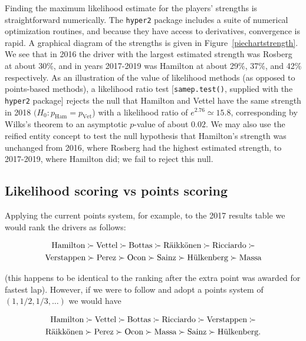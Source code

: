 \documentclass[a4,12pt]{article}
\begin{document}
Finding the maximum likelihood estimate for the players' strengths is
straightforward numerically. The \texttt{hyper2} package includes a
suite of numerical optimization routines, and because they have access
to derivatives, convergence is rapid.  A graphical diagram of the
strengths is given in Figure~\ref{piechartstrength}.  We see that in
2016 the driver with the largest estimated strength was Rosberg at
about 30\%, and in years 2017-2019 was Hamilton at about 29\%, 37\%,
and 42\% respectively. As an illustration of the value of likelihood
methods (as opposed to points-based methods), a likelihood ratio test
[\texttt{samep.test()}, supplied with the \texttt{hyper2} package]
rejects the null that Hamilton and Vettel have the same strength in
2018 $(H_0\colon p_\mathrm{Ham}= p_\mathrm{Vet}$) with a likelihood
ratio of $e^{2.76}\simeq 15.8$, corresponding by Wilks's theorem to an
asymptotic \(p\)-value of about \(0.02\). We may also use the reified
entity concept to test the null hypothesis that Hamilton's strength
was unchanged from 2016, where Rosberg had the highest estimated
strength, to 2017-2019, where Hamilton did; we fail to reject this
null.

\subsection{Likelihood scoring vs points
scoring}\label{likelihood-scoring-vs-points-scoring}

Applying the current points system, for example, to the 2017 results
table we would rank the drivers as follows:

\begin{multline}\nonumber
\mbox{Hamilton}\succ
\mbox{Vettel}\succ
\mbox{Bottas}\succ
\mbox{R\"{a}ikk\"{o}nen}\succ
\mbox{Ricciardo}\succ\\
\mbox{Verstappen}\succ
\mbox{Perez}\succ
\mbox{Ocon}\succ
\mbox{Sainz}\succ
\mbox{H\"{u}lkenberg}\succ
\mbox{Massa}
\end{multline}

\noindent (this happens to be identical to the ranking after the extra
point was awarded for fastest lap).  However, if we were to follow
\citet{zipf1949} and adopt a points system of $(1,1/2,1/3,\ldots)$ we
would have

\begin{multline}\nonumber
\mbox{Hamilton}\succ
\mbox{Vettel}\succ
\mbox{Bottas}\succ
\mbox{Ricciardo}\succ
\mbox{Verstappen}\succ\\
\mbox{R\"{a}ikk\"{o}nen}\succ
\mbox{Perez}\succ
\mbox{Ocon}\succ
\mbox{Massa}\succ
\mbox{Sainz}\succ
\mbox{H\"{u}lkenberg}.
\end{multline}
\end{document}
